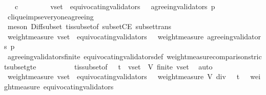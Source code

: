 \begin{isabellebody}
\ \ \ {\isachardoublequoteopen}c\ {\isasymin}\ {\isasymepsilon}\ {\isasymsigma}{\isachardoublequoteclose}\isanewline
\ \ \isamarkupfalse%
\ \isamarkupfalse%
\ {\isachardoublequoteopen}v{\isacharunderscore}set\ {\isacharminus}\ equivocating{\isacharunderscore}validators\ {\isasymsigma}\ {\isasymsubseteq}\ agreeing{\isacharunderscore}validators\ {\isacharparenleft}p{\isacharcomma}\ {\isasymsigma}{\isacharparenright}{\isachardoublequoteclose}\ \isanewline
\ \ \ \ \isamarkupfalse%
\ clique{\isacharunderscore}imps{\isacharunderscore}everyone{\isacharunderscore}agreeing\isanewline
\ \ \ \ \isamarkupfalse%
\ {\isacharparenleft}meson\ Diff{\isacharunderscore}subset\ {\isasymSigma}t{\isacharunderscore}is{\isacharunderscore}subset{\isacharunderscore}of{\isacharunderscore}{\isasymSigma}\ subsetCE\ subset{\isacharunderscore}trans{\isacharparenright}\isanewline
\ \ \isamarkupfalse%
\ \isamarkupfalse%
\ {\isachardoublequoteopen}weight{\isacharunderscore}measure\ {\isacharparenleft}v{\isacharunderscore}set\ {\isacharminus}\ equivocating{\isacharunderscore}validators\ {\isasymsigma}{\isacharparenright}\ {\isasymle}\ weight{\isacharunderscore}measure\ {\isacharparenleft}agreeing{\isacharunderscore}validators\ {\isacharparenleft}p{\isacharcomma}\ {\isasymsigma}{\isacharparenright}{\isacharparenright}{\isachardoublequoteclose}\isanewline
\ \ \ \ \isamarkupfalse%
\ agreeing{\isacharunderscore}validators{\isacharunderscore}finite\ equivocating{\isacharunderscore}validators{\isacharunderscore}def\ weight{\isacharunderscore}measure{\isacharunderscore}comparison{\isacharunderscore}strict{\isacharunderscore}subset{\isacharunderscore}gte\isanewline
\ \ \ \ \ \ \ \ \ \ {\isasymSigma}t{\isacharunderscore}is{\isacharunderscore}subset{\isacharunderscore}of{\isacharunderscore}{\isasymSigma}\ {\isacartoucheopen}{\isasymsigma}\ {\isasymin}\ {\isasymSigma}t\ {\isasymand}\ v{\isacharunderscore}set\ {\isasymsubseteq}\ V{\isacartoucheclose}\ {\isacartoucheopen}finite\ v{\isacharunderscore}set{\isacartoucheclose}\ \isamarkupfalse%
\ auto\isanewline
\ \ \isamarkupfalse%
\ {\isachardoublequoteopen}weight{\isacharunderscore}measure\ {\isacharparenleft}v{\isacharunderscore}set\ {\isacharminus}\ equivocating{\isacharunderscore}validators\ {\isasymsigma}{\isacharparenright}\ {\isachargreater}\ {\isacharparenleft}weight{\isacharunderscore}measure\ V{\isacharparenright}\ div\ {}\ {\isacharplus}\ t\ \ {\isacharminus}\ weight{\isacharunderscore}measure\ {\isacharparenleft}equivocating{\isacharunderscore}validators\ {\isasymsigma}{\isacharparenright}{\isachardoublequoteclose}\isanewline

\end{isabellebody}
